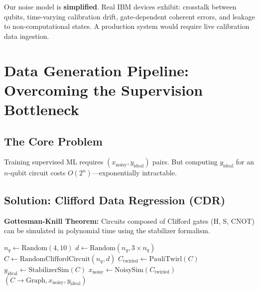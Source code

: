 \documentclass[11pt, a4paper]{article}
\begin{document}
\begin{limitation}
Our noise model is \textbf{simplified}. Real IBM devices exhibit: crosstalk between qubits, time-varying calibration drift, gate-dependent coherent errors, and leakage to non-computational states. A production system would require live calibration data ingestion.
\end{limitation}

\section{Data Generation Pipeline: Overcoming the Supervision Bottleneck}

\subsection{The Core Problem}

Training supervised ML requires $(x_{\text{noisy}}, y_{\text{ideal}})$ pairs. But computing $y_{\text{ideal}}$ for an $n$-qubit circuit costs $O(2^n)$---exponentially intractable.

\subsection{Solution: Clifford Data Regression (CDR)}

\textbf{Gottesman-Knill Theorem:} Circuits composed of Clifford gates (H, S, CNOT) can be simulated in polynomial time using the stabilizer formalism.

\begin{algorithm}[H]
\caption{CDR-Based Data Generation}
\begin{algorithmic}[1]
    \State $n_q \gets \text{Random}(4, 10)$ 
    \State $d \gets \text{Random}(n_q, 3 \times n_q)$ 
    \State $C \gets \text{RandomCliffordCircuit}(n_q, d)$
    \State $C_{\text{twirled}} \gets \text{PauliTwirl}(C)$ 
    \State $y_{\text{ideal}} \gets \text{StabilizerSim}(C)$ 
    \State $x_{\text{noisy}} \gets \text{NoisySim}(C_{\text{twirled}})$
    \State {}$(C \rightarrow \text{Graph}, x_{\text{noisy}}, y_{\text{ideal}})$
\EndFor
\end{algorithmic}
\end{algorithm}
\end{document}
